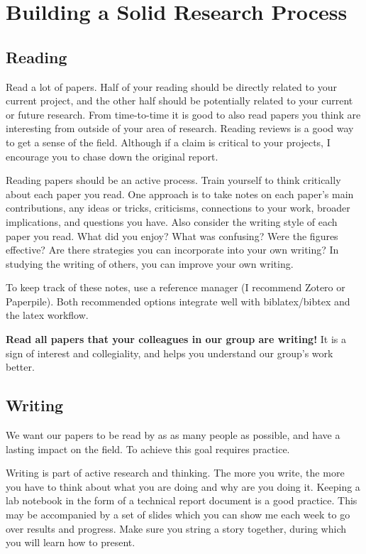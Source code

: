 \documentclass[12pt]{article}
\begin{document}
\section{Building a Solid Research Process}

\subsection{Reading}

Read a lot of papers.
Half of your reading should be directly related to your current project, and the other half should be potentially related to your current or future research.
From time-to-time it is good to also read papers you think are interesting from outside of your area of research.
Reading reviews is a good way to get a sense of the field.
Although if a claim is critical to your projects, I encourage you to chase down the original report.

Reading papers should be an active process.
Train yourself to think critically about each paper you read.
One approach is to take notes on each paper's main contributions, any ideas or tricks, criticisms, connections to your work, broader implications, and questions you have.
Also consider the writing style of each paper you read.
What did you enjoy?
What was confusing?
Were the figures effective?
Are there strategies you can incorporate into your own writing?
In studying the writing of others, you can improve your own writing.

To keep track of these notes, use a reference manager (I recommend Zotero or Paperpile).
Both recommended options integrate well with biblatex/bibtex and the latex workflow.

\textbf{Read all papers that your colleagues in our group are writing!}
It is a sign of interest and collegiality, and helps you understand our group's work better.

\subsection{Writing}
We want our papers to be read by as as many people as possible, and have a lasting impact on the field.
To achieve this goal requires practice.

Writing is part of active research and thinking.
The more you write, the more you have to think about what you are doing and why are you doing it.
Keeping a lab notebook in the form of a technical report document is a good practice.
This may be accompanied by a set of slides which you can show me each week to go over results and progress.
Make sure you string a story together, during which you will learn how to present.
\end{document}
